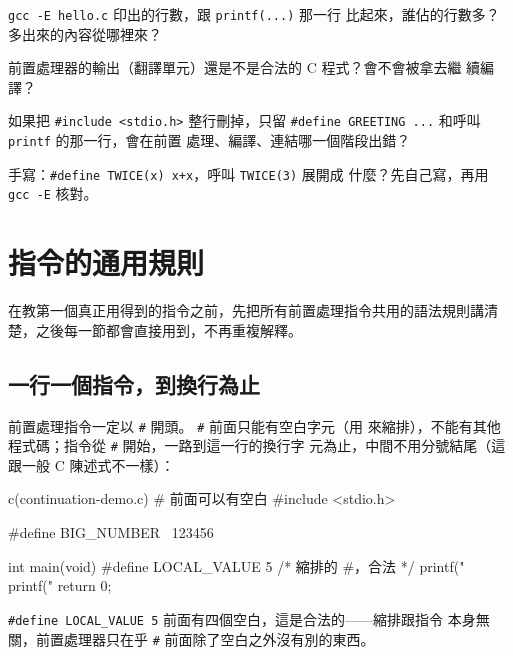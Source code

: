 
\begin{drills}[label=drills:pp-what]
\item \texttt{gcc -E hello.c} 印出的行數，跟 \texttt{printf(...)} 那一行
比起來，誰佔的行數多？多出來的內容從哪裡來？
\item 前置處理器的輸出（翻譯單元）還是不是合法的 C 程式？會不會被拿去繼
續編譯？
\item 如果把 \texttt{\#include <stdio.h>} 整行刪掉，只留
\texttt{\#define GREETING ...} 和呼叫 \texttt{printf} 的那一行，會在前置
處理、編譯、連結哪一個階段出錯？
\item 手寫：\texttt{\#define TWICE(x) x+x}，呼叫 \texttt{TWICE(3)} 展開成
什麼？先自己寫，再用 \texttt{gcc -E} 核對。
\end{drills}

\section{指令的通用規則}
\label{sec:pp-syntax}

在教第一個真正用得到的指令之前，先把所有前置處理指令共用的語法規則講清
楚，之後每一節都會直接用到，不再重複解釋。

\subsection{一行一個指令，到換行為止}

前置處理指令一定以 \texttt{\#} 開頭。 \texttt{\#} 前面只能有空白字元（用
來縮排），不能有其他程式碼；指令從 \texttt{\#} 開始，一路到這一行的換行字
元為止，中間不用分號結尾（這跟一般 C 陳述式不一樣）：

\begin{example}{c}{(continuation-demo.c) \# 前面可以有空白}
#include <stdio.h>

#define BIG_NUMBER \
    123456

int main(void) {
    #define LOCAL_VALUE 5   /* 縮排的 #，合法 */
    printf("%
    printf("%
    return 0;
}
\end{example}


\texttt{\#define LOCAL\_VALUE 5} 前面有四個空白，這是合法的——縮排跟指令
本身無關，前置處理器只在乎 \texttt{\#} 前面除了空白之外沒有別的東西。

